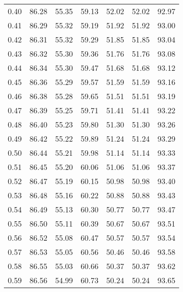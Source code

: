\begin{tabular}{|c|c|c|c|c|c|c|}
      0.40 &     86.28 &     55.35 &      59.13 &   52.02 &      52.02 &         92.97 \\
      0.41 &     86.29 &     55.32 &      59.19 &   51.92 &      51.92 &         93.00 \\
      0.42 &     86.31 &     55.32 &      59.29 &   51.85 &      51.85 &         93.04 \\
      0.43 &     86.32 &     55.30 &      59.36 &   51.76 &      51.76 &         93.08 \\
      0.44 &     86.34 &     55.30 &      59.47 &   51.68 &      51.68 &         93.12 \\
      0.45 &     86.36 &     55.29 &      59.57 &   51.59 &      51.59 &         93.16 \\
      0.46 &     86.38 &     55.28 &      59.65 &   51.51 &      51.51 &         93.19 \\
      0.47 &     86.39 &     55.25 &      59.71 &   51.41 &      51.41 &         93.22 \\
      0.48 &     86.40 &     55.23 &      59.80 &   51.30 &      51.30 &         93.26 \\
      0.49 &     86.42 &     55.22 &      59.89 &   51.24 &      51.24 &         93.29 \\
      0.50 &     86.44 &     55.21 &      59.98 &   51.14 &      51.14 &         93.33 \\
      0.51 &     86.45 &     55.20 &      60.06 &   51.06 &      51.06 &         93.37 \\
      0.52 &     86.47 &     55.19 &      60.15 &   50.98 &      50.98 &         93.40 \\
      0.53 &     86.48 &     55.16 &      60.22 &   50.88 &      50.88 &         93.43 \\
      0.54 &     86.49 &     55.13 &      60.30 &   50.77 &      50.77 &         93.47 \\
      0.55 &     86.50 &     55.11 &      60.39 &   50.67 &      50.67 &         93.51 \\
      0.56 &     86.52 &     55.08 &      60.47 &   50.57 &      50.57 &         93.54 \\
      0.57 &     86.53 &     55.05 &      60.56 &   50.46 &      50.46 &         93.58 \\
      0.58 &     86.55 &     55.03 &      60.66 &   50.37 &      50.37 &         93.62 \\
      0.59 &     86.56 &     54.99 &      60.73 &   50.24 &      50.24 &         93.65 \\

\end{tabular}
